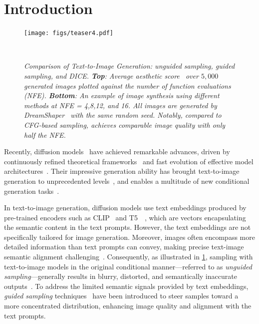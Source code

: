 \section{Introduction}
\label{intro}

\begin{figure}[t!]
    \texttt{[image: figs/teaser4.pdf]}
~\vspace{-2em}
\caption{\small \it
Comparison of Text-to-Image Generation: unguided sampling, guided sampling, and DICE.  
{\bf Top}: Average aesthetic score~\cite{schuhmann2022laion} over $5,000$ generated images plotted against the {\it number of function evaluations} (NFE). {\bf Bottom}: An example of image synthesis using different methods at NFE = 4,8,12, and 16. All images are generated by DreamShaper~\cite{DreamShaper} with the same random seed. Notably, compared to CFG-based sampling, \ourName achieves comparable image quality with only half the NFE.
}
\label{fig:teaser}
~\vspace{-2em}
\end{figure}

Recently, diffusion models~\cite{sohl2015deep,song2019ncsn,ho2020ddpm} have achieved remarkable advances, driven by continuously refined theoretical frameworks~\cite{song2021sde,karras2022edm,chen2024trajectory,kingma2024understanding} and fast evolution of effective model architectures~\cite{peebles2023scalable,bao2023all}.
Their impressive generation ability has brought text-to-image generation to unprecedented levels~\cite{rombach2022ldm,saharia2022photorealistic,podell2024sdxl,esser2024scaling}, and enables a multitude of new conditional generation tasks~\cite{croitoru2023diffusion,zhan2024conditional}.

In text-to-image generation, diffusion models use text embeddings produced by pre-trained encoders such as CLIP~\cite{radford2021learning} and T5~\cite{raffel2020exploring}~\cite{nichol2022glide,rombach2022ldm,saharia2022photorealistic}, which are vectors encapsulating the semantic content in the text prompts. However, the text embeddings are not specifically tailored for image generation. Moreover, images often encompass more detailed information than text prompts can convey, making precise text-image semantic alignment challenging~\cite{schrodi2024two}. Consequently, as illustrated in \cref{fig:teaser}, sampling with text-to-image models in the original conditional manner—referred to as \textit{unguided sampling}—generally results in blurry, distorted, and semantically inaccurate outputs~\cite{meng2023distillation,karras2024guiding}. To address the limited semantic signals provided by text embeddings, \textit{guided sampling} techniques~\cite{dhariwal2021diffusion,ho2022classifier} have been introduced to steer samples toward a more concentrated distribution, enhancing image quality and alignment with the text prompts.  

